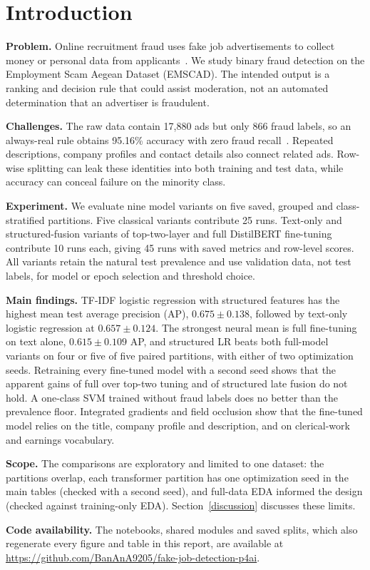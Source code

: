 \section{Introduction}
\label{intro}

\textbf{Problem.} Online recruitment fraud uses fake job advertisements to collect money or
personal data from applicants~\cite{vidros2017}. We study binary fraud detection on the Employment
Scam Aegean Dataset (EMSCAD). The intended output is a ranking and decision rule that could assist
moderation, not an automated determination that an advertiser is fraudulent.

\textbf{Challenges.} The raw data contain 17,880 ads but only 866 fraud labels, so an always-real
rule obtains 95.16\% accuracy with zero fraud recall~\cite{vidros2017}. Repeated descriptions, company profiles and
contact details also connect related ads. Row-wise splitting can leak these identities into both
training and test data, while accuracy can conceal failure on the minority class.

\textbf{Experiment.} We evaluate nine model variants on five saved, grouped and class-stratified
partitions. Five classical variants contribute 25 runs. Text-only and structured-fusion variants of
top-two-layer and full DistilBERT fine-tuning contribute 10 runs each, giving 45 runs with saved
metrics and row-level scores. All variants retain the natural test prevalence and use validation
data, not test labels, for model or epoch selection and threshold choice.

\textbf{Main findings.} TF-IDF logistic regression with structured features has the highest mean
test average precision (AP), $0.675 \pm 0.138$, followed by text-only logistic regression at
$0.657 \pm 0.124$. The strongest neural mean is full fine-tuning on text alone, $0.615 \pm 0.109$
AP, and structured LR beats both full-model variants on four or five of five paired partitions, with
either of two optimization seeds. Retraining every fine-tuned model with a second seed shows that the
apparent gains of full over top-two tuning and of structured late fusion do not hold. A one-class SVM
trained without fraud labels does no better than the prevalence floor. Integrated gradients and field
occlusion show that the fine-tuned model relies on the title, company profile and description, and
on clerical-work and earnings vocabulary.

\textbf{Scope.} The comparisons are exploratory and limited to one dataset: the partitions overlap,
each transformer partition has one optimization seed in the main tables (checked with a second seed), and full-data EDA informed the design (checked against training-only EDA).
Section~\ref{discussion} discusses these limits.

\textbf{Code availability.} The notebooks, shared modules and saved splits, which also regenerate
every figure and table in this report, are available at \url{https://github.com/BanAnA9205/fake-job-detection-p4ai}.

